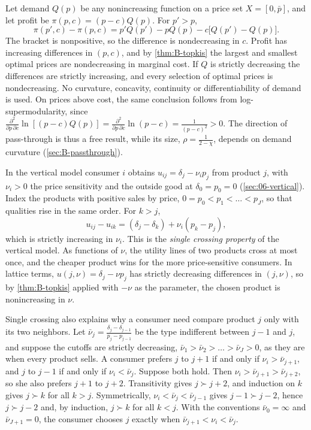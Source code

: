 \begin{example}\label{ex:B-topkis-monopoly}
Let demand $Q(p)$ be any nonincreasing function on a price set $X = [0, \bar p]$, and let profit be
$\pi(p, c) = (p - c)Q(p)$. For $p' > p$,
\[
  \pi(p', c) - \pi(p, c) = p'Q(p') - pQ(p) - c\bigl[Q(p') - Q(p)\bigr].
\]
The bracket is nonpositive, so the difference is nondecreasing in $c$. Profit has increasing differences in
$(p, c)$, and by \cref{thm:B-topkis} the largest and smallest optimal prices are nondecreasing in marginal cost.
If $Q$ is strictly decreasing the differences are strictly increasing, and every selection of optimal prices is
nondecreasing. No curvature, concavity, continuity or differentiability of demand is used. On prices above cost,
the same conclusion follows from log-supermodularity, since
$\frac{\partial^2}{\partial p\,\partial c}\ln[(p - c)Q(p)] = \frac{\partial^2}{\partial p\,\partial c}\ln(p - c) = \frac{1}{(p - c)^2} > 0$.
The direction of pass-through is thus a free result, while its size, $\rho = \frac{1}{2 - \chi}$, depends on demand
curvature (\cref{sec:B-passthrough}).
\end{example}

\begin{example}\label{ex:B-vertical-sorting}
In the vertical model consumer $i$ obtains $u_{ij} = \delta_j - \nu_ip_j$ from product $j$, with $\nu_i > 0$ the price
sensitivity and the outside good at $\delta_0 = p_0 = 0$ (\cref{sec:06-vertical}). Index the products with positive
sales by price, $0 = p_0 < p_1 < \dots < p_J$, so that qualities rise in the same order. For $k > j$,
\[
  u_{ij} - u_{ik} = (\delta_j - \delta_k) + \nu_i(p_k - p_j),
\]
which is strictly increasing in $\nu_i$. This is the \emph{single crossing property} of the vertical model. As
functions of $\nu$, the utility lines of two products cross at most once, and the cheaper product wins for the
more price-sensitive consumers. In lattice terms, $u(j, \nu) = \delta_j - \nu p_j$ has strictly decreasing differences
in $(j, \nu)$, so by \cref{thm:B-topkis} applied with $-\nu$ as the parameter, the chosen product is nonincreasing in $\nu$.

Single crossing also explains why a consumer need compare product $j$ only with its two neighbors. Let
$\bar\nu_j = \frac{\delta_j - \delta_{j-1}}{p_j - p_{j-1}}$ be the type indifferent between $j - 1$ and $j$, and suppose the cutoffs
are strictly decreasing, $\bar\nu_1 > \bar\nu_2 > \dots > \bar\nu_J > 0$, as they are when every product sells. A
consumer prefers $j$ to $j + 1$ if and only if $\nu_i > \bar\nu_{j+1}$, and $j$ to $j - 1$ if and only if
$\nu_i < \bar\nu_j$. Suppose both hold. Then $\nu_i > \bar\nu_{j+1} > \bar\nu_{j+2}$, so she also prefers $j + 1$ to $j + 2$.
Transitivity gives $j \succ j + 2$, and induction on $k$ gives $j \succ k$ for all $k > j$. Symmetrically,
$\nu_i < \bar\nu_j < \bar\nu_{j-1}$ gives $j - 1 \succ j - 2$, hence $j \succ j - 2$ and, by induction, $j \succ k$ for all $k < j$.
With the conventions $\bar\nu_0 = \infty$ and $\bar\nu_{J+1} = 0$, the consumer chooses $j$ exactly when
$\bar\nu_{j+1} < \nu_i < \bar\nu_j$.
\end{example}

